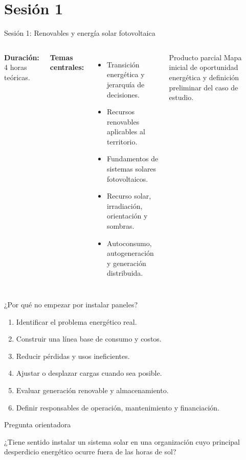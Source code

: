 \documentclass[aspectratio=169,10pt]{beamer}
\newcommand{\pregunta}[1]{
\begin{exampleblock}{Pregunta orientadora}
#1
\end{exampleblock}
}
\begin{document}
\section{Sesión 1}

\begin{frame}{Sesión 1: Renovables y energía solar fotovoltaica}
\begin{columns}
\textbf{Duración:} 4 horas teóricas.

\vspace{0.3cm}

\textbf{Temas centrales:}
\begin{itemize}
    \item Transición energética y jerarquía de decisiones.
    \item Recursos renovables aplicables al territorio.
    \item Fundamentos de sistemas solares fotovoltaicos.
    \item Recurso solar, irradiación, orientación y sombras.
    \item Autoconsumo, autogeneración y generación distribuida.
\end{itemize}

\begin{block}{Producto parcial}
Mapa inicial de oportunidad energética y definición preliminar del caso de estudio.
\end{block}
\end{columns}
\end{frame}

\begin{frame}{¿Por qué no empezar por instalar paneles?}
\begin{enumerate}
    \item Identificar el problema energético real.
    \item Construir una línea base de consumo y costos.
    \item Reducir pérdidas y usos ineficientes.
    \item Ajustar o desplazar cargas cuando sea posible.
    \item Evaluar generación renovable y almacenamiento.
    \item Definir responsables de operación, mantenimiento y financiación.
\end{enumerate}

\pregunta{
¿Tiene sentido instalar un sistema solar en una organización cuyo principal desperdicio energético ocurre fuera de las horas de sol?
}
\end{frame}
\end{document}
